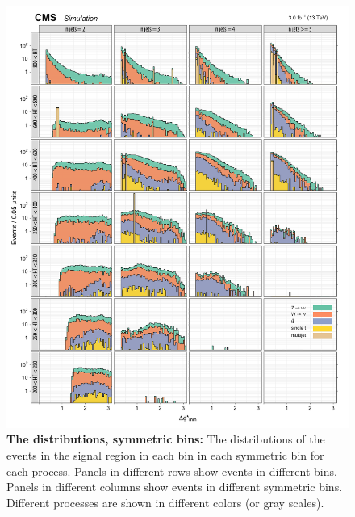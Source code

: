 \begin{figure}[!h]
\centering
\includegraphics[scale=0.95]{figures/kiplots/c150107_s150318_f015_biasedDPhi_100}
\caption{\textbf{\boldmath The \bdphi distributions, symmetric \njet
bins:} The \bdphi distributions of the events in the signal region in
each \scalht bin in each symmetric \njet bin for each process. Panels in
different rows show events in different \scalht bins. Panels in
different columns show events in different symmetric \njet bins.
Different processes are shown in different colors (or gray scales).}
\label{c150107_s150318_f015_biasedDPhi_100}
\end{figure}

